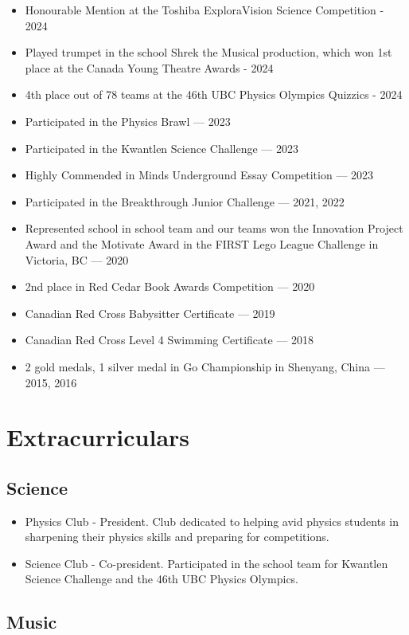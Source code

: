 \documentclass{article}
\begin{document}
\begin{itemize}
	\item Honourable Mention at the Toshiba ExploraVision Science Competition - 2024
	\item Played trumpet in the school Shrek the Musical production, which won 1st place at the Canada Young Theatre Awards - 2024
	\item 4th place out of 78 teams at the 46th UBC Physics Olympics Quizzics - 2024
	\item Participated in the Physics Brawl — 2023
	\item Participated in the Kwantlen Science Challenge — 2023
	\item Highly Commended in Minds Underground Essay Competition — 2023
	\item Participated in the Breakthrough Junior Challenge — 2021, 2022
	\item Represented school in school team and our teams won the Innovation Project Award and the Motivate Award in the FIRST Lego League Challenge in Victoria, BC — 2020
	\item 2nd place in Red Cedar Book Awards Competition — 2020
	\item Canadian Red Cross Babysitter Certificate — 2019
	\item Canadian Red Cross Level 4 Swimming Certificate — 2018
	\item 2 gold medals, 1 silver medal in Go Championship in Shenyang, China — 2015, 2016
\end{itemize}

\section*{Extracurriculars}

\subsection*{Science}

\begin{itemize}
	\item Physics Club - President. Club dedicated to helping avid physics students in sharpening their physics skills and preparing for competitions.
	\item Science Club - Co-president. Participated in the school team for Kwantlen Science Challenge and the 46th UBC Physics Olympics.
\end{itemize}

\subsection*{Music}
\end{document}
